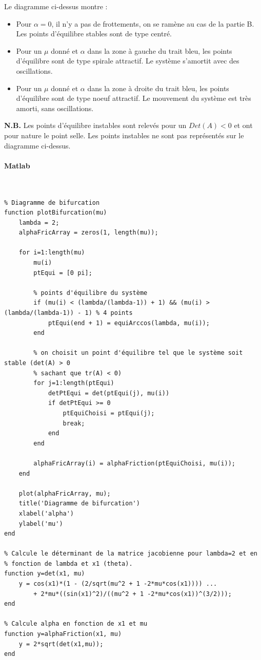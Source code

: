 \documentclass[11pt]{article}
\newlength{\leftbarwidth}
\newlength{\leftbarsep}
\newcommand*{\leftbarcolorcmd}{\color{leftbarcolor}} %
\renewenvironment{leftbar}{%
    \def\FrameCommand{{\leftbarcolorcmd{\vrule width \leftbarwidth\relax\hspace {\leftbarsep}}}}%
    \MakeFramed {\advance \hsize -\width \FrameRestore }%
}{%
    \endMakeFramed
}
\begin{document}
Le diagramme ci-dessus montre :
\begin{itemize}
	\item Pour $\alpha = 0$, il n'y a pas de frottements, on se ramène au cas de la partie B. Les points d'équilibre stables sont de type centré.
	\item Pour un $\mu$ donné et $\alpha$ dans la zone à gauche du trait bleu, les points d'équilibre sont de type spirale attractif. Le système s'amortit avec des oscillations.
	\item Pour un $\mu$ donné et $\alpha$ dans la zone à droite du trait bleu, les points d'équilibre sont de type noeuf attractif. Le mouvement du système est très amorti, sans oscillations.
\end{itemize}

\begin{leftbar}
	\textbf{N.B.} Les points d'équilibre instables sont relevés pour un $Det(A) < 0$ et ont pour nature le point selle. Les points instables ne sont pas représentés sur le diagramme ci-dessus.
\end{leftbar}
\newpage

\paragraph{Matlab}\mbox{}\\
\begin{lstlisting}
% Diagramme de bifurcation
function plotBifurcation(mu)
    lambda = 2;
    alphaFricArray = zeros(1, length(mu));

    for i=1:length(mu)
        mu(i)
        ptEqui = [0 pi];

        % points d'équilibre du système
        if (mu(i) < (lambda/(lambda-1)) + 1) && (mu(i) > (lambda/(lambda-1)) - 1) % 4 points
            ptEqui(end + 1) = equiArccos(lambda, mu(i));
        end

        % on choisit un point d'équilibre tel que le système soit stable (det(A) > 0
        % sachant que tr(A) < 0)
        for j=1:length(ptEqui)
            detPtEqui = det(ptEqui(j), mu(i))
            if detPtEqui >= 0
                ptEquiChoisi = ptEqui(j);
                break;
            end
        end

        alphaFricArray(i) = alphaFriction(ptEquiChoisi, mu(i));
    end

    plot(alphaFricArray, mu);
    title('Diagramme de bifurcation')
    xlabel('alpha')
    ylabel('mu')
end

% Calcule le déterminant de la matrice jacobienne pour lambda=2 et en
% fonction de lambda et x1 (theta).
function y=det(x1, mu)
    y = cos(x1)*(1 - (2/sqrt(mu^2 + 1 -2*mu*cos(x1)))) ...
        + 2*mu*((sin(x1)^2)/((mu^2 + 1 -2*mu*cos(x1))^(3/2)));
end

% Calcule alpha en fonction de x1 et mu
function y=alphaFriction(x1, mu)
    y = 2*sqrt(det(x1,mu));
end
\end{lstlisting}
\end{document}
